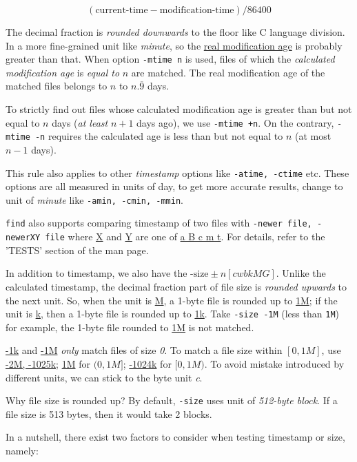 \[ ( \text{current-time} - \text{modification-time} ) / 86400 \]

The decimal fraction is \textit{rounded downwards} to the floor
like C language division. In a more fine-grained unit like
\textit{minute}, so the \uline{real modification age} is probably
greater than that. When option \lstinline|-mtime n| is used, files
of which the \textit{calculated modification age} is \textit{equal
  to} $n$ are matched. The real modification age of the matched
files belongs to $n$ to $n.\overline{9}$ days.

To strictly find out files whose calculated modification age is
greater than but not equal to $n$ days (\textit{at least} $n + 1$
days ago), we use \lstinline|-mtime +n|. On the contrary,
\lstinline|-mtime -n| requires the calculated age is less than but
not equal to $n$ (at most $n - 1$ days).

This rule also applies to other \textit{timestamp} options like
\lstinline|-atime, -ctime| etc. These options are all measured in
units of day, to get more accurate results, change to unit of
\textit{minute} like \lstinline|-amin, -cmin, -mmin|.

\lstinline|find| also supports comparing timestamp of two files
with \lstinline|-newer file, -newerXY file| where \uline{X} and
\uline{Y} are one of \uline{a B c m t}. For details, refer to the
'TESTS' section of the man page.

In addition to timestamp, we also have the
$\text{-size} \pm n[cwbkMG]$. Unlike the calculated timestamp, the
decimal fraction part of file size is \textit{rounded upwards} to
the next unit. So, when the unit is \uline{M}, a 1-byte file is
rounded up to \uline{1M}; if the unit is \uline{k}, then a 1-byte
file is rounded up to \uline{1k}. Take \lstinline|-size -1M| (less
than \lstinline|1M|) for example, the 1-byte file rounded to
\uline{1M} is not matched.

\uline{-1k} and \uline{-1M} \textit{only} match files of size
\textit{0}. To match a file size within $[0,1M]$, use \uline{-2M,
  -1025k}; \uline{1M} for $(0,1M]$; \uline{-1024k} for
$[0,1M)$. To avoid mistake introduced by different units, we can
stick to the byte unit \textit{c}.

Why file size is rounded up? By default, \lstinline|-size| uses
unit of \textit{512-byte block}. If a file size is 513 bytes, then
it would take 2 blocks.

In a nutshell, there exist two factors to consider when testing
timestamp or size, namely:

